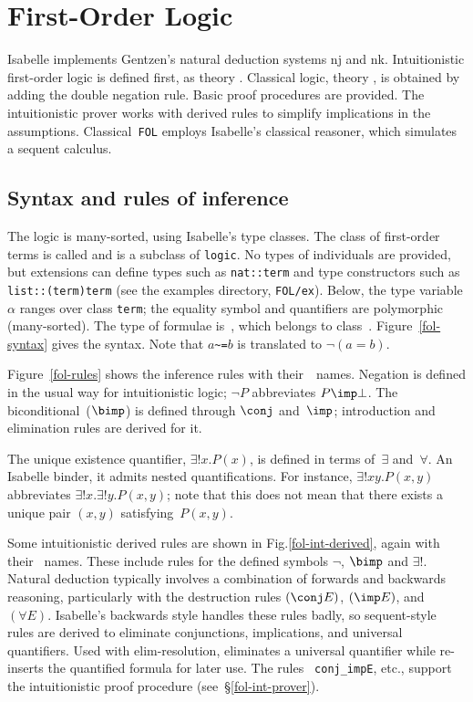 \chapter{First-Order Logic}

Isabelle implements Gentzen's natural deduction systems {\sc nj} and {\sc
  nk}.  Intuitionistic first-order logic is defined first, as theory
.  Classical logic, theory , is
obtained by adding the double negation rule.  Basic proof procedures are
provided.  The intuitionistic prover works with derived rules to simplify
implications in the assumptions.  Classical~{\tt FOL} employs Isabelle's
classical reasoner, which simulates a sequent calculus.

\section{Syntax and rules of inference}
The logic is many-sorted, using Isabelle's type classes.  The class of
first-order terms is called  and is a subclass of {\tt logic}.
No types of individuals are provided, but extensions can define types such
as {\tt nat::term} and type constructors such as {\tt list::(term)term}
(see the examples directory, {\tt FOL/ex}).  Below, the type variable
$\alpha$ ranges over class {\tt term}; the equality symbol and quantifiers
are polymorphic (many-sorted).  The type of formulae is~, which
belongs to class~.  Figure~\ref{fol-syntax} gives the syntax.
Note that $a$\verb|~=|$b$ is translated to $\neg(a=b)$.

Figure~\ref{fol-rules} shows the inference rules with their~\ML\ names.
Negation is defined in the usual way for intuitionistic logic; $\neg P$
abbreviates $P\imp\bot$.  The biconditional~($\bimp$) is defined through
$\conj$ and~$\imp$; introduction and elimination rules are derived for it.

The unique existence quantifier, $\exists!x.P(x)$, is defined in terms
of~$\exists$ and~$\forall$.  An Isabelle binder, it admits nested
quantifications.  For instance, $\exists!x y.P(x,y)$ abbreviates
$\exists!x. \exists!y.P(x,y)$; note that this does not mean that there
exists a unique pair $(x,y)$ satisfying~$P(x,y)$.

Some intuitionistic derived rules are shown in
Fig.\ts\ref{fol-int-derived}, again with their \ML\ names.  These include
rules for the defined symbols $\neg$, $\bimp$ and $\exists!$.  Natural
deduction typically involves a combination of forwards and backwards
reasoning, particularly with the destruction rules $(\conj E)$,
$({\imp}E)$, and~$(\forall E)$.  Isabelle's backwards style handles these
rules badly, so sequent-style rules are derived to eliminate conjunctions,
implications, and universal quantifiers.  Used with elim-resolution,
 eliminates a universal quantifier while 
re-inserts the quantified formula for later use.  The rules {\tt
conj_impE}, etc., support the intuitionistic proof procedure
(see~\S\ref{fol-int-prover}).


